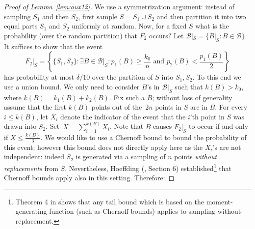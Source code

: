 \documentclass{article}
\def\B{{\mathcal B}}
\newcommand{\samp}{S}
\newcommand{\comment}[3]{}  %
\newcommand{\shay}[1]{\comment{purple}{Shay}{#1}}
\newcommand{\yoav}[1]{\comment{green}{Yoav}{#1}}
\begin{document}
\begin{proof}[Proof of Lemma~\ref{lem:aux12}]
We use a symmetrization argument: instead of sampling $\samp_1$ and then $\samp_2$,
	first sample $\samp=\samp_1\cup \samp_2$ and then partition it into two equal parts 
	$\samp_1$ and $\samp_2$ uniformly at random.
	Now, for a fixed $\samp$ what is the probability (over the random partition) that $F_2$ occurs?
	Let $\B|_{\samp} = \{B|_{\samp} : B\in\B\}$.
	It suffices to show that the event
\[F_2|_{\samp} = 
\left\{ \{S_1,S_2\}:
\exists {B\in\B|_{\samp}}:
  p_{1}(B)\geq \frac{k_0}{n} \mbox{ and } p_{2}(B) < \frac{p_{1}(B)}{2}
  \right\}
\]
has probability at most $\delta/10$ over the partition of $\samp$ into $\samp_1,\samp_2$.
To this end we use a union bound. 
	We only need to consider $B$'s in $\B|_{\samp}$ such that $k(B) > k_0$, where $k(B) = k_{1}(B)+ k_{2}(B)$. 
	Fix such a $B$; without loss of generality assume that the first $k(B)$ points 
	out of the~$2n$ points in $S$ are in $B$. 	For every $i\leq k(B)$, let $X_i$ denote 
	the indicator of the event that the $i$'th point in $S$ was drawn into $S_2$.
	Set~$X=\sum_{i=1}^{k(B)}X_i$.
	Note that $B$ causes $F_2|_{\samp}$ to occur if and only if $X\leq \frac{k(B)}{3}$.
	We would like to use a Chernoff bound to bound the probability of this event; 
	however this bound does not directly apply here as the $X_i$'s are not independent:
	indeed $S_2$ is generated via a sampling of $n$ points {\it without replacements} from $S$.
	Nevertheless, Hoeffding (\cite{H63}, Section 6) established\footnote{Theorem 4 in \cite{H63} shows 
	that any tail bound which is based on the moment-generating function (such as Chernoff bounds) applies to sampling-without-		replacement. \shay{Perhaps move this discussion to a section dedicated to tehcnical background.}} that Chernoff bounds apply also in this setting. Therefore:

\end{proof}
\end{document}
